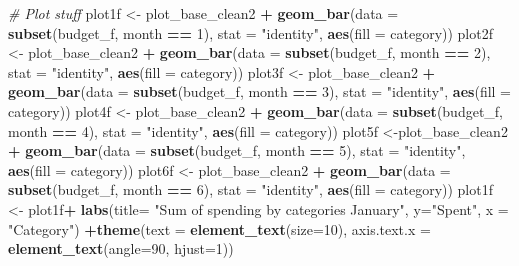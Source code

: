 \documentclass[
]{article}
\newenvironment{Shaded}{\begin{snugshade}}{\end{snugshade}}
\newcommand{\CommentTok}[1]{\textcolor[rgb]{0.56,0.35,0.01}{\textit{#1}}}
\newcommand{\DataTypeTok}[1]{\textcolor[rgb]{0.13,0.29,0.53}{#1}}
\newcommand{\DecValTok}[1]{\textcolor[rgb]{0.00,0.00,0.81}{#1}}
\newcommand{\KeywordTok}[1]{\textcolor[rgb]{0.13,0.29,0.53}{\textbf{#1}}}
\newcommand{\NormalTok}[1]{#1}
\newcommand{\OperatorTok}[1]{\textcolor[rgb]{0.81,0.36,0.00}{\textbf{#1}}}
\newcommand{\StringTok}[1]{\textcolor[rgb]{0.31,0.60,0.02}{#1}}
\begin{document}
\begin{Shaded}
\begin{Highlighting}[]
\CommentTok{# Plot stuff}
\NormalTok{plot1f <-}\StringTok{ }\NormalTok{plot_base_clean2 }\OperatorTok{+}\StringTok{ }\KeywordTok{geom_bar}\NormalTok{(}\DataTypeTok{data =} \KeywordTok{subset}\NormalTok{(budget_f, month }\OperatorTok{==}\StringTok{ }\DecValTok{1}\NormalTok{), }\DataTypeTok{stat =} \StringTok{"identity"}\NormalTok{, }\KeywordTok{aes}\NormalTok{(}\DataTypeTok{fill =}\NormalTok{ category))  }
\NormalTok{plot2f <-}\StringTok{ }\NormalTok{plot_base_clean2 }\OperatorTok{+}\StringTok{ }\KeywordTok{geom_bar}\NormalTok{(}\DataTypeTok{data =} \KeywordTok{subset}\NormalTok{(budget_f, month }\OperatorTok{==}\StringTok{ }\DecValTok{2}\NormalTok{), }\DataTypeTok{stat =} \StringTok{"identity"}\NormalTok{, }\KeywordTok{aes}\NormalTok{(}\DataTypeTok{fill =}\NormalTok{ category))}
\NormalTok{plot3f <-}\StringTok{ }\NormalTok{plot_base_clean2 }\OperatorTok{+}\StringTok{ }\KeywordTok{geom_bar}\NormalTok{(}\DataTypeTok{data =} \KeywordTok{subset}\NormalTok{(budget_f, month }\OperatorTok{==}\StringTok{ }\DecValTok{3}\NormalTok{), }\DataTypeTok{stat =} \StringTok{"identity"}\NormalTok{, }\KeywordTok{aes}\NormalTok{(}\DataTypeTok{fill =}\NormalTok{ category))}
\NormalTok{plot4f <-}\StringTok{ }\NormalTok{plot_base_clean2 }\OperatorTok{+}\StringTok{ }\KeywordTok{geom_bar}\NormalTok{(}\DataTypeTok{data =} \KeywordTok{subset}\NormalTok{(budget_f, month }\OperatorTok{==}\StringTok{ }\DecValTok{4}\NormalTok{), }\DataTypeTok{stat =} \StringTok{"identity"}\NormalTok{, }\KeywordTok{aes}\NormalTok{(}\DataTypeTok{fill =}\NormalTok{ category))}
\NormalTok{plot5f <-plot_base_clean2 }\OperatorTok{+}\StringTok{ }\KeywordTok{geom_bar}\NormalTok{(}\DataTypeTok{data =} \KeywordTok{subset}\NormalTok{(budget_f, month }\OperatorTok{==}\StringTok{ }\DecValTok{5}\NormalTok{), }\DataTypeTok{stat =} \StringTok{"identity"}\NormalTok{, }\KeywordTok{aes}\NormalTok{(}\DataTypeTok{fill =}\NormalTok{ category))}
\NormalTok{plot6f <-}\StringTok{ }\NormalTok{plot_base_clean2 }\OperatorTok{+}\StringTok{ }\KeywordTok{geom_bar}\NormalTok{(}\DataTypeTok{data =} \KeywordTok{subset}\NormalTok{(budget_f, month }\OperatorTok{==}\StringTok{ }\DecValTok{6}\NormalTok{), }\DataTypeTok{stat =} \StringTok{"identity"}\NormalTok{, }\KeywordTok{aes}\NormalTok{(}\DataTypeTok{fill =}\NormalTok{ category))}
\NormalTok{plot1f <-}\StringTok{ }\NormalTok{plot1f}\OperatorTok{+}\StringTok{ }\KeywordTok{labs}\NormalTok{(}\DataTypeTok{title=} \StringTok{"Sum of spending by categories January"}\NormalTok{, }\DataTypeTok{y=}\StringTok{"Spent"}\NormalTok{, }\DataTypeTok{x =} \StringTok{"Category"}\NormalTok{) }\OperatorTok{+}\KeywordTok{theme}\NormalTok{(}\DataTypeTok{text =} \KeywordTok{element_text}\NormalTok{(}\DataTypeTok{size=}\DecValTok{10}\NormalTok{), }\DataTypeTok{axis.text.x =} \KeywordTok{element_text}\NormalTok{(}\DataTypeTok{angle=}\DecValTok{90}\NormalTok{, }\DataTypeTok{hjust=}\DecValTok{1}\NormalTok{)) }

\end{Highlighting}
\end{Shaded}
\end{document}
